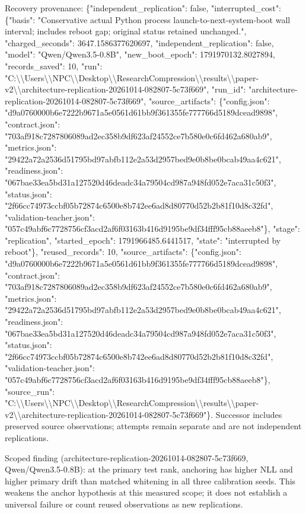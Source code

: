 \documentclass[10pt]{article}
\begin{document}
Recovery provenance: \{"independent\_replication": false, "interrupted\_cost": \{"basis": "Conservative actual Python process launch-to-next-system-boot wall interval; includes reboot gap; original status retained unchanged.", "charged\_seconds": 3647.1586377620697, "independent\_replication": false, "model": "Qwen/Qwen3.5-0.8B", "new\_boot\_epoch": 1791970132.8027894, "records\_saved": 10, "run": "C:\textbackslash{}\textbackslash{}Users\textbackslash{}\textbackslash{}NPC\textbackslash{}\textbackslash{}Desktop\textbackslash{}\textbackslash{}ResearchCompression\textbackslash{}\textbackslash{}results\textbackslash{}\textbackslash{}paper-v2\textbackslash{}\textbackslash{}architecture-replication-20261014-082807-5c73f669", "run\_id": "architecture-replication-20261014-082807-5c73f669", "source\_artifacts": \{"config.json": "d9a0760000b6e7222b9671a5e0561d61bb9f361355fe777766d5189dcead9898", "contract.json": "703af918c7287806089ad2ec358b9df623af24552ce7b580e0c6fd462a680ab9", "metrics.json": "29422a72a2536d51795bd97abfb112e2a53d2957bed9e0b8be0bcab49aa4c621", "readiness.json": "067bae33ea5bd31a127520d46deadc34a79504cd987a948fd052e7aca31c50f3", "status.json": "2f66cc74973ccbf05b72874c6500e8b742ee6ad8d80770d52b2b81f10d8c32fd", "validation-teacher.json": "057c49abf6c7728756cf3acd2af6f03163b416d9195be9df34fff95cb88aeeb8"\}, "stage": "replication", "started\_epoch": 1791966485.6441517, "state": "interrupted by reboot"\}, "reused\_records": 10, "source\_artifacts": \{"config.json": "d9a0760000b6e7222b9671a5e0561d61bb9f361355fe777766d5189dcead9898", "contract.json": "703af918c7287806089ad2ec358b9df623af24552ce7b580e0c6fd462a680ab9", "metrics.json": "29422a72a2536d51795bd97abfb112e2a53d2957bed9e0b8be0bcab49aa4c621", "readiness.json": "067bae33ea5bd31a127520d46deadc34a79504cd987a948fd052e7aca31c50f3", "status.json": "2f66cc74973ccbf05b72874c6500e8b742ee6ad8d80770d52b2b81f10d8c32fd", "validation-teacher.json": "057c49abf6c7728756cf3acd2af6f03163b416d9195be9df34fff95cb88aeeb8"\}, "source\_run": "C:\textbackslash{}\textbackslash{}Users\textbackslash{}\textbackslash{}NPC\textbackslash{}\textbackslash{}Desktop\textbackslash{}\textbackslash{}ResearchCompression\textbackslash{}\textbackslash{}results\textbackslash{}\textbackslash{}paper-v2\textbackslash{}\textbackslash{}architecture-replication-20261014-082807-5c73f669"\}. Successor includes preserved source observations; attempts remain separate and are not independent replications.


Scoped finding (architecture-replication-20261014-082807-5c73f669, Qwen/Qwen3.5-0.8B): at the primary test rank, anchoring has higher NLL and higher primary drift than matched whitening in all three calibration seeds. This weakens the anchor hypothesis at this measured scope; it does not establish a universal failure or count reused observations as new replications.
\end{document}
